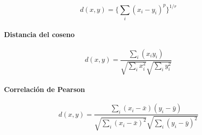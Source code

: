 \begin{equation}
d(x,y) = \Big\{\sum_{i} (x_i-y_i)^p\Big\}^{1/r}
\end{equation}

\paragraph{Distancia del coseno}\label{dcoseno}

\begin{equation}
d(x,y) = \frac{\sum_{i} (x_iy_i)}{\sqrt{\sum_{i} x_i^2}\sqrt{\sum_{i} y_i^2}}
\end{equation}


\paragraph{Correlaci\'on de Pearson}\label{dpearson}

\begin{equation}
d(x,y) = \frac{\sum_{i} (x_i-\bar{x})(y_i-\bar{y})}{\sqrt{\sum_{i} (x_i-\bar{x})^2}\sqrt{\sum_{i} (y_i-\bar{y})^2}}
\end{equation}
